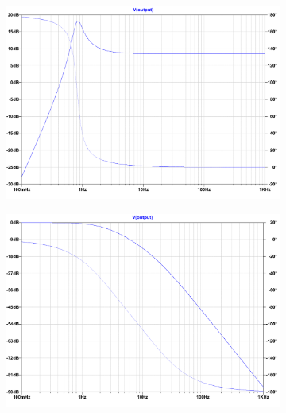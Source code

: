 \begin{figure}[]
 \footnotesize
 \centering
    \begin{subfigure}[]{0.48\textwidth}
              \centering
  		\includegraphics[width=1\linewidth]{./Figures/HPFBode.pdf}
		    \caption{} \label{subfig:HPFBodePlot}
     \end{subfigure}
     \begin{subfigure}[]{0.48\textwidth}
             \centering
  		\includegraphics[width=1.0\linewidth]{./Figures/LPFBode.pdf}
		   \caption{ } \label{subfig:LPFBodePlot}
     \end{subfigure}
    \begin{subfigure}[]{0.35\textwidth}
              \centering

\end{subfigure}
\end{figure}
